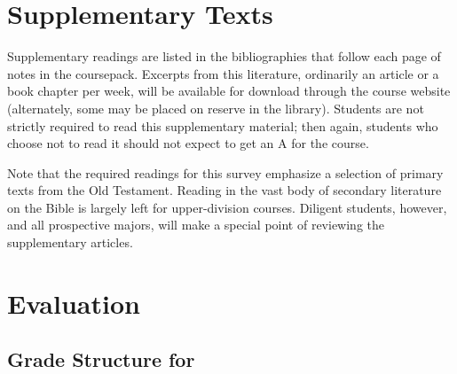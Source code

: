 \documentclass[titlepage]{article}
\begin{document}
\section{Supplementary Texts}
\label{supplementary}

Supplementary readings are listed in the bibliographies that follow each
page of notes in the coursepack. Excerpts from this literature,
ordinarily an article or a book chapter per week, will be available for
download through the course website (alternately, some may be placed on
reserve in the library). Students are not strictly required to read this
supplementary material; then again, students who choose not to read it
should not expect to get an A for the course.

Note that the required readings for this survey emphasize a selection of
primary texts from the Old Testament. Reading in the vast body of
secondary literature on the Bible is largely left for upper-division
courses. Diligent students, however, and all prospective majors, will
make a special point of reviewing the supplementary articles.

\section{Evaluation}
\label{evaluation}

\subsection{Grade Structure for \ccode}
\label{structure}

\end{document}
